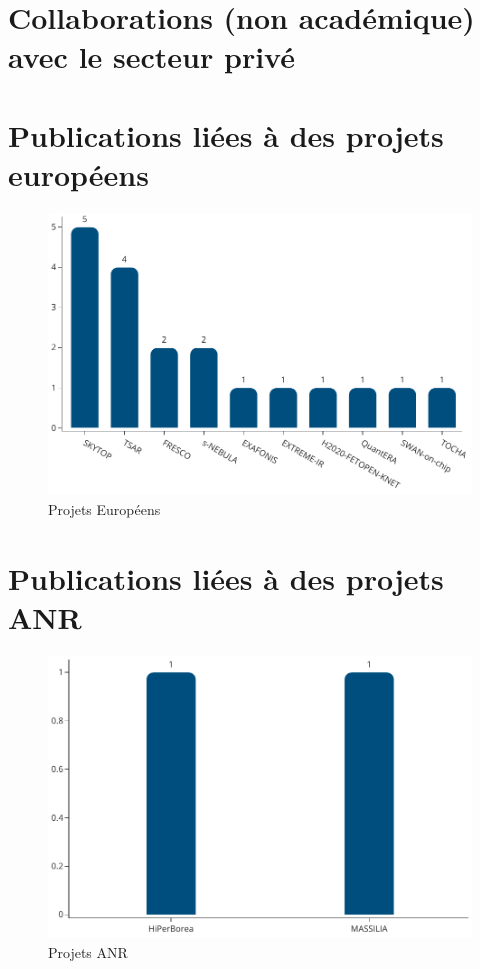 \documentclass[french, 11pt]{../../dibiso/biso}
\begin{document}
\pagebreak

\section{Collaborations (non académique) avec le secteur privé}


\pagebreak

\section{Publications liées à des projets européens}

\begin{figure}[!h]
  \includegraphics[width=.8\textwidth]{figures/eu_projects.pdf}
  \centering
  \caption{Projets Européens}
  \label{fig_eu_projects}
\end{figure}



\section{Publications liées à des projets ANR}

\begin{figure}[!h]
  \includegraphics[width=.8\textwidth]{figures/anr_projects.pdf}
  \centering
  \caption{Projets ANR}
  \label{fig_anr_projects}
\end{figure}
\end{document}
